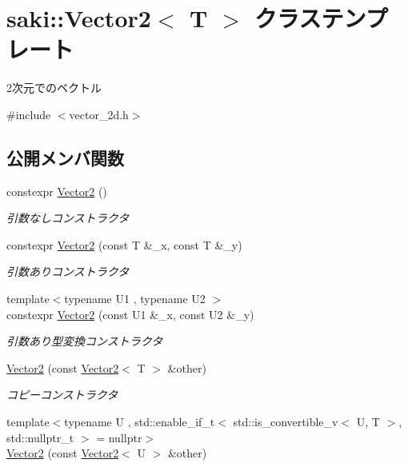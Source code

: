 \hypertarget{classsaki_1_1_vector2}{}\section{saki\+:\+:Vector2$<$ T $>$ クラステンプレート}
\label{classsaki_1_1_vector2}


2次元でのベクトル  




{\ttfamily \#include $<$vector\+\_\+2d.\+h$>$}

\subsection*{公開メンバ関数}
\begin{DoxyCompactItemize}
\item 
constexpr \mbox{\hyperlink{classsaki_1_1_vector2_af57b72f4255812a361bef1922a226f86}{Vector2}} ()
\begin{DoxyCompactList}\small\item\em 引数なしコンストラクタ \end{DoxyCompactList}\item 
constexpr \mbox{\hyperlink{classsaki_1_1_vector2_ad0f3d0a05370f1ef4947520245f6e9a8}{Vector2}} (const T \&\+\_\+x, const T \&\+\_\+y)
\begin{DoxyCompactList}\small\item\em 引数ありコンストラクタ \end{DoxyCompactList}\item 
{\footnotesize template$<$typename U1 , typename U2 $>$ }\\constexpr \mbox{\hyperlink{classsaki_1_1_vector2_aa23ab3fe9095929f882fbdbb01aa4470}{Vector2}} (const U1 \&\+\_\+x, const U2 \&\+\_\+y)
\begin{DoxyCompactList}\small\item\em 引数あり型変換コンストラクタ \end{DoxyCompactList}\item 
\mbox{\hyperlink{classsaki_1_1_vector2_ad4d30b23ef121c4ebc6786885ac5c83f}{Vector2}} (const \mbox{\hyperlink{classsaki_1_1_vector2}{Vector2}}$<$ T $>$ \&other)
\begin{DoxyCompactList}\small\item\em コピーコンストラクタ \end{DoxyCompactList}\item 
{\footnotesize template$<$typename U , std\+::enable\+\_\+if\+\_\+t$<$ std\+::is\+\_\+convertible\+\_\+v$<$ U, T $>$, std\+::nullptr\+\_\+t $>$  = nullptr$>$ }\\\mbox{\hyperlink{classsaki_1_1_vector2_a42b53654af45a1ab8f5591c3168092a6}{Vector2}} (const \mbox{\hyperlink{classsaki_1_1_vector2}{Vector2}}$<$ U $>$ \&other)

\end{DoxyCompactItemize}
